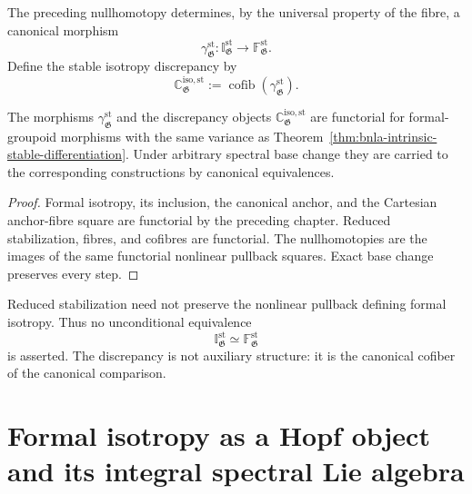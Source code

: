 \begin{definition}
\label{def:bnla-stable-isotropy-comparison}
The preceding nullhomotopy determines, by the universal property of the fibre,
a canonical morphism
\[
    \boxed{
    \gamma^{\mathrm{st}}_{\mathfrak G}:
    \mathbb I^{\mathrm{st}}_{\mathfrak G}
    \longrightarrow
    \mathbb F^{\mathrm{st}}_{\mathfrak G}.}
\]
Define the stable isotropy discrepancy by
\[
    \mathbb C^{\mathrm{iso,st}}_{\mathfrak G}
    :=
    \operatorname{cofib}
    \left(\gamma^{\mathrm{st}}_{\mathfrak G}\right).
\]
\end{definition}

\begin{proposition}
\label{prop:bnla-isotropy-comparison-functoriality}
The morphisms $\gamma^{\mathrm{st}}_{\mathfrak G}$ and the discrepancy objects
$\mathbb C^{\mathrm{iso,st}}_{\mathfrak G}$ are functorial for formal-groupoid
morphisms with the same variance as
Theorem~\ref{thm:bnla-intrinsic-stable-differentiation}.  Under arbitrary
spectral base change they are carried to the corresponding constructions by
canonical equivalences.
\end{proposition}

\begin{proof}
Formal isotropy, its inclusion, the canonical anchor, and the Cartesian
anchor-fibre square are functorial by the preceding chapter.  Reduced
stabilization, fibres, and cofibres are functorial.  The nullhomotopies are the
images of the same functorial nonlinear pullback squares.  Exact base change
preserves every step.
\end{proof}

\begin{remark}
Reduced stabilization need not preserve the nonlinear pullback defining
formal isotropy.  Thus no unconditional equivalence
\[
    \mathbb I^{\mathrm{st}}_{\mathfrak G}
    \simeq
    \mathbb F^{\mathrm{st}}_{\mathfrak G}
\]
is asserted.  The discrepancy is not auxiliary structure: it is the canonical
cofiber of the canonical comparison.
\end{remark}

\section{Formal isotropy as a Hopf object and its integral spectral Lie algebra}
\label{sec:bnla-spectral-lie-isotropy}

